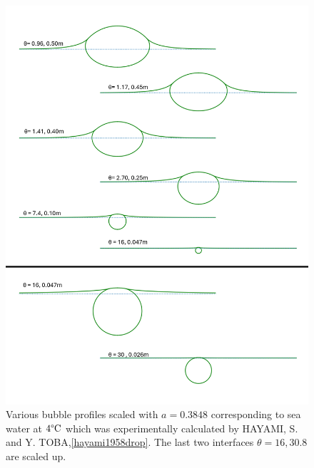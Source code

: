 \begin{figure}[hb]
    \centering
    \includegraphics[width=0.95\linewidth]{WriteUp/images/Bubble profiles.png}
    \caption{Various bubble profiles scaled with $a=0.3848$ corresponding to sea water at $4 \degree \text{C}$ which was experimentally calculated by HAYAMI, S. and Y. TOBA,\ref{hayami1958drop}. The last two interfaces $\theta=16,30.8$ are scaled up.}
    \label{fig:11}
\end{figure}
